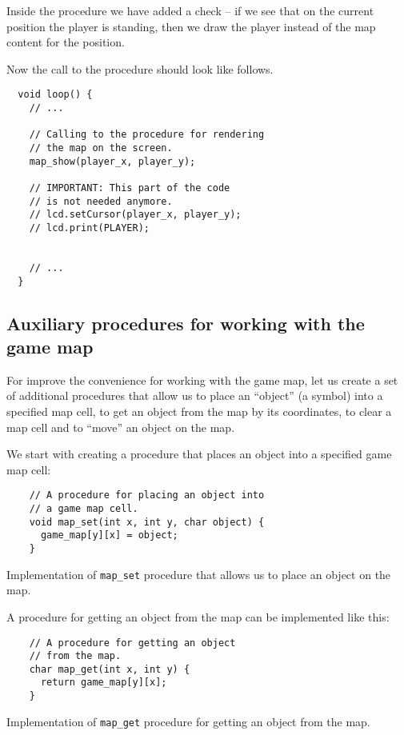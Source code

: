 \documentclass[../sparc.tex]{subfiles}
\begin{document}
Inside the procedure we have added a check -- if we see that on the current
position the player is standing, then we draw the player instead of the map
content for the position.

Now the call to the procedure should look like follows.

\begin{verbatim}
  void loop() {
    // ...

    // Calling to the procedure for rendering
    // the map on the screen.
    map_show(player_x, player_y);

    // IMPORTANT: This part of the code
    // is not needed anymore.
    // lcd.setCursor(player_x, player_y);
    // lcd.print(PLAYER);


    // ...
  }
\end{verbatim}

\subsection{Auxiliary procedures for working with the game map}
\label{game-dev-game-map:extra-procedures}

For improve the convenience for working with the game map, let us create a set
of additional procedures that allow us to place an ``object'' (a symbol) into a
specified map cell, to get an object from the map by its coordinates, to clear a
map cell and to ``move'' an object on the map.

We start with creating a procedure that places an object into a specified game
map cell:

\begin{listing}[H]
  \begin{verbatim}
    // A procedure for placing an object into
    // a game map cell.
    void map_set(int x, int y, char object) {
      game_map[y][x] = object;
    }
  \end{verbatim}
  \caption{Implementation of \texttt{map_set} procedure that allows us
    to place an object on the map.}
  \label{listing:game-dev-map-set-procedure}
\end{listing}

A procedure for getting an object from the map can be implemented like this:

\begin{listing}[H]
  \begin{verbatim}
    // A procedure for getting an object
    // from the map.
    char map_get(int x, int y) {
      return game_map[y][x];
    }
  \end{verbatim}
  \caption{Implementation of \texttt{map_get} procedure for getting an
    object from the map.}
  \label{listing:game-dev-map-get--procedure}
\end{listing}
\end{document}
